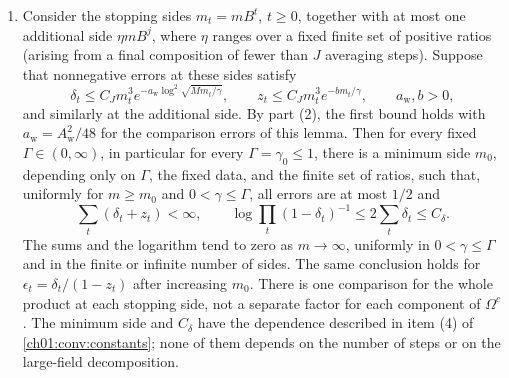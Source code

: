 \begin{lemma}
\begin{enumerate}
\item Consider the stopping sides $m_t=mB^t$, $t\ge0$, together with at most one additional side $\eta mB^j$, where $\eta$ ranges over a fixed finite set of positive ratios (arising from a final composition of fewer than $J$ averaging steps). Suppose that nonnegative errors at these sides satisfy
\[
 \delta_t\le C_Jm_t^3e^{-a_{\mathrm w}\log^2\sqrt{Mm_t/\gamma}},\qquad z_t\le C_Jm_t^3e^{-bm_t/\gamma},\qquad a_{\mathrm w},b>0,
\]
and similarly at the additional side. By part (2), the first bound holds with $a_{\mathrm w}=A_{\mathrm w}^2/48$ for the comparison errors of this lemma. Then for every fixed $\Gamma\in(0,\infty)$, in particular for every $\Gamma=\gamma_0\le1$, there is a minimum side $m_0$, depending only on $\Gamma$, the fixed data, and the finite set of ratios, such that, uniformly for $m\ge m_0$ and $0<\gamma\le\Gamma$, all errors are at most $1/2$ and
\[
 \sum_t(\delta_t+z_t)<\infty,\qquad\log\prod_t(1-\delta_t)^{-1}\le2\sum_t\delta_t\le C_\delta.
\]
The sums and the logarithm tend to zero as $m\to\infty$, uniformly in $0<\gamma\le\Gamma$ and in the finite or infinite number of sides. The same conclusion holds for $\epsilon_t=\delta_t/(1-z_t)$ after increasing $m_0$. There is one comparison for the whole product at each stopping side, not a separate factor for each component of $\Omega^c$. The minimum side and $C_\delta$ have the dependence described in item (4) of \cref{ch01:conv:constants}; none of them depends on the number of steps or on the large-field decomposition.
\end{enumerate}
\end{lemma}

